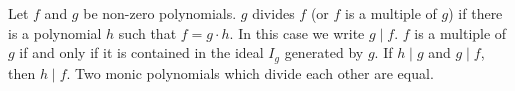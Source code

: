 Let $f$ and $g$ be non-zero polynomials. $g$ divides $f$ (or $f$ is a multiple of $g$) if there is a polynomial $h$ such that $f = g \cdot h$. In this case we write $g \mid f$. $f$ is a multiple of $g$ if and only if it is contained in the ideal $I_g$ generated by $g$. If $h \mid g$ and $g \mid f$, then $h \mid f$. Two monic polynomials which divide each other are equal.
